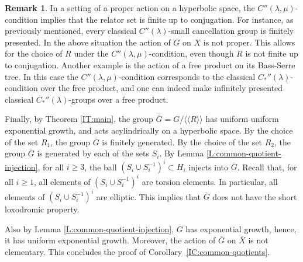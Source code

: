 \documentclass[leqno,a4paper,10pt]{amsart}
\theoremstyle{plain}
\theoremstyle{definition}
\newtheorem{rem}[thm]{Remark}
\theoremstyle{remark}
\newcommand{\q}[1]{\overline{#1}}
\begin{document}
\begin{rem} In a setting of a proper action on a hyperbolic space, the $C''(\lambda,\mu)$-condition implies that the relator set is finite up to conjugation. For instance, as previously mentioned, every classical $C''(\lambda)$-small cancellation group is finitely presented. In the above situation the action of $G$ on $X$ is not proper. This allows for the choice of $R$ under the $C''(\lambda,\mu)$-condition, even though $R$ is not finite up to conjugation. Another example is the action of a free product on its Bass-Serre tree. In this case the $C''(\lambda,\mu)$-condition corresponds to the classical $C_*''(\lambda)$-condition over the free product, and one can indeed make infinitely presented classical $C_*''(\lambda)$-groups over a free product. 
\end{rem}

 Finally, by Theorem \ref{IT:main}, the group $\overline{G}=G/\langle\langle R \rangle\rangle$ has uniform uniform exponential growth, and acts acylindrically on a hyperbolic space. By the choice of the set $R_1$, the group $\overline{G}$ is finitely generated.  By the choice of the set $R_2$, the group $\overline{G}$ is generated by each of the sets $S_i$. By Lemma \ref{L:common-quotient-injection}, for all $i\geqslant 3$, the ball $(S_i\cup S_i^{-1})^i\subset H_i$ injects into $\overline G$. Recall that, for all $i\geqslant 1$, all elements of $(S_i\cup S_i^{-1})^i$ are torsion elements. In particular, all elements of $(S_i\cup S_i^{-1})^i$ are elliptic.  This implies that $\q G$ does not have the short loxodromic property.
 
 Also by Lemma \ref{L:common-quotient-injection}, $\overline G$ has exponential growth, hence, it has uniform exponential growth. Moreover, the action of $\overline G$ on $\overline X$ is not elementary. This  concludes the proof of Corollary~\ref{IC:common-quotients}.




% 

\end{document}
